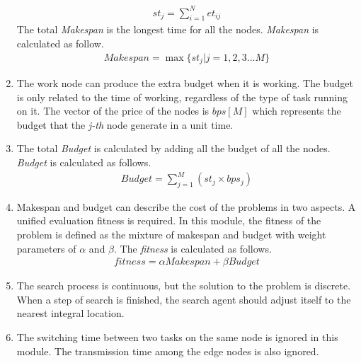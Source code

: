 \begin{enumerate}[]
    \begin{eqnarray}
        st_{j}=\sum_{i=1}^{N} et_{ij}
    \end{eqnarray}
    The total \emph{Makespan} is the longest time for all the nodes. \emph{Makespan} is calculated as follow.
    \begin{eqnarray}
        Makespan=\max\{st_j | j=1,2,3...M\}
    \end{eqnarray}
    \item The work node can produce the extra budget when it is working. The budget is only related to the time of working, regardless of the type of task running on it. The vector of the price of the nodes is $bps[M]$ which represents the budget that the \emph{j-th} node generate in a unit time.
    \item  The total \emph{Budget} is calculated by adding all the budget of all the nodes. \emph{Budget} is calculated as follows.
    \begin{eqnarray}
        Budget=\sum_{j=1}^{M} (st_j \times bps_j)
    \end{eqnarray}
    \item Makespan and budget can describe the cost of the problems in two aspects. A unified evaluation fitness is required. In this module, the fitness of the problem is defined as the mixture of makespan and budget with weight parameters of $\alpha$ and $\beta$. The \emph{fitness} is calculated as follows.
    \begin{eqnarray}
        fitness=\alpha Makespan + \beta Budget
    \end{eqnarray}
    \item The search process is continuous, but the solution to the problem is discrete. When a step of search is finished, the search agent should adjust itself to the nearest integral location.
    \item The switching time between two tasks on the same node is ignored in this module. The transmission time among the edge nodes is also ignored. 
\end{enumerate}
